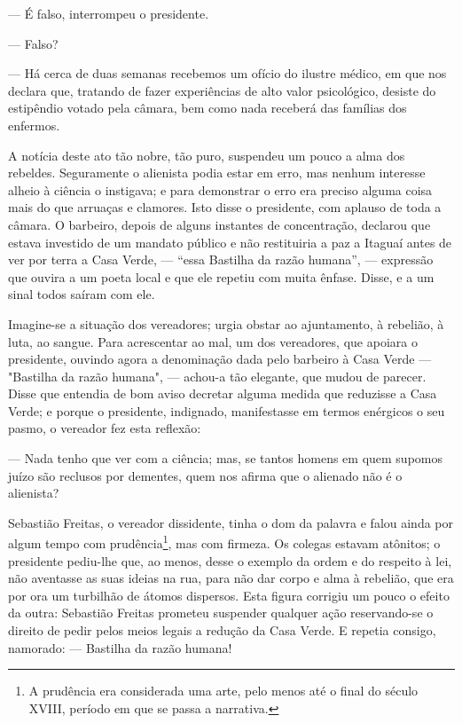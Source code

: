 --- É falso, interrompeu o presidente.

--- Falso?

--- Há cerca de duas semanas recebemos um ofício do ilustre médico, em
que nos declara que, tratando de fazer experiências de alto valor
psicológico, desiste do estipêndio votado pela câmara, bem como nada
receberá das famílias dos enfermos.

A notícia deste ato tão nobre, tão puro, suspendeu um pouco a alma dos
rebeldes. Seguramente o alienista podia estar em erro, mas nenhum
interesse alheio à ciência o instigava; e para demonstrar o erro era
preciso alguma coisa mais do que arruaças e clamores. Isto disse o
presidente, com aplauso de toda a câmara. O barbeiro, depois de alguns
instantes de concentração, declarou que estava investido de um mandato
público e não restituiria a paz a Itaguaí antes de ver por terra a Casa
Verde, --- ``essa Bastilha da razão humana'', --- expressão que ouvira a
um poeta local e que ele repetiu com muita ênfase. Disse, e a um sinal
todos saíram com ele.

Imagine-se a situação dos vereadores; urgia obstar ao ajuntamento, à
rebelião, à luta, ao sangue. Para acrescentar ao mal, um dos vereadores,
que apoiara o presidente, ouvindo agora a denominação dada pelo barbeiro
à Casa Verde --- "Bastilha da razão humana", --- achou-a tão elegante,
que mudou de parecer. Disse que entendia de bom aviso decretar alguma
medida que reduzisse a Casa Verde; e porque o presidente, indignado,
manifestasse em termos enérgicos o seu pasmo, o vereador fez esta
reflexão:

--- Nada tenho que ver com a ciência; mas, se tantos homens em quem
supomos juízo são reclusos por dementes, quem nos afirma que o alienado
não é o alienista?

Sebastião Freitas, o vereador dissidente, tinha o dom da palavra e falou
ainda por algum tempo com prudência\footnote{A prudência era considerada
  uma arte, pelo menos até o final do século XVIII, período em que se
  passa a narrativa.}, mas com firmeza. Os colegas estavam atônitos; o
presidente pediu-lhe que, ao menos, desse o exemplo da ordem e do
respeito à lei, não aventasse as suas ideias na rua, para não dar corpo
e alma à rebelião, que era por ora um turbilhão de átomos dispersos.
Esta figura corrigiu um pouco o efeito da outra: Sebastião Freitas
prometeu suspender qualquer ação reservando-se o direito de pedir pelos
meios legais a redução da Casa Verde. E repetia consigo, namorado: ---
Bastilha da razão humana!

